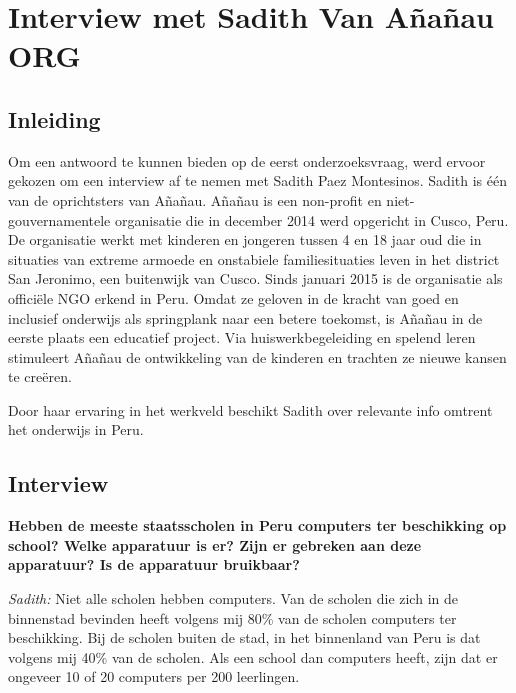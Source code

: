 
\chapter{Interview met Sadith Van Añañau ORG}
\label{ch:interviewMetSadith}

\section{Inleiding}
Om een antwoord te kunnen bieden op de eerst onderzoeksvraag, werd ervoor gekozen om een interview af te nemen met Sadith Paez Montesinos. Sadith is één van de oprichtsters van Añañau. Añañau is een non-profit en niet-gouvernamentele organisatie die in december 2014 werd opgericht in Cusco, Peru. De organisatie werkt met kinderen en jongeren tussen 4 en 18 jaar oud die in situaties van extreme armoede en onstabiele familiesituaties leven in het district San Jeronimo, een buitenwijk van Cusco. Sinds januari 2015 is de organisatie als officiële NGO erkend in Peru. Omdat ze geloven in de kracht van goed en inclusief onderwijs als springplank naar een betere toekomst, is Añañau in de eerste plaats een educatief project. Via huiswerkbegeleiding en spelend leren stimuleert Añañau de ontwikkeling van de kinderen en trachten ze nieuwe kansen te creëren. \autocite{Ananau2020}

Door haar ervaring in het werkveld beschikt Sadith over relevante info omtrent het onderwijs in Peru. 

\section{Interview}
\textbf{Hebben de meeste staatsscholen in Peru computers ter beschikking op school? Welke apparatuur is er? Zijn er gebreken aan deze apparatuur? Is de apparatuur bruikbaar?}

\textit{Sadith:} Niet alle scholen hebben computers. Van de scholen die zich in de binnenstad bevinden heeft volgens mij 80\% van de scholen computers ter beschikking. Bij de scholen buiten de stad, in het binnenland van Peru is dat volgens mij 40\% van de scholen. Als een school dan computers heeft, zijn dat er ongeveer 10 of 20 computers per 200 leerlingen.

